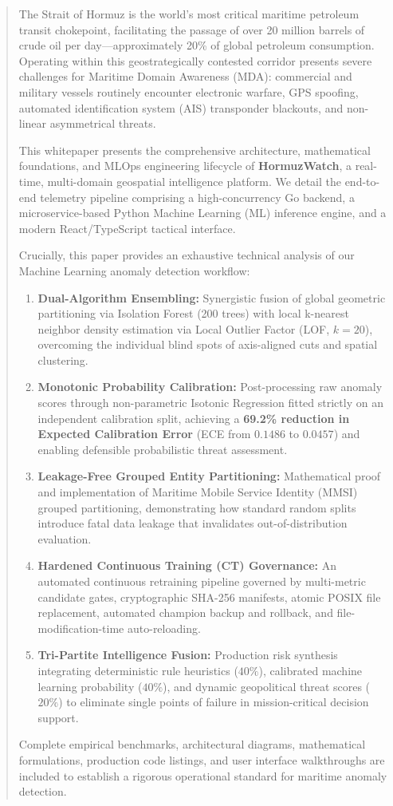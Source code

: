 \begin{abstract}
The Strait of Hormuz is the world's most critical maritime petroleum transit chokepoint, facilitating the passage of over 20 million barrels of crude oil per day—approximately 20\% of global petroleum consumption. Operating within this geostrategically contested corridor presents severe challenges for Maritime Domain Awareness (MDA): commercial and military vessels routinely encounter electronic warfare, GPS spoofing, automated identification system (AIS) transponder blackouts, and non-linear asymmetrical threats. 

This whitepaper presents the comprehensive architecture, mathematical foundations, and MLOps engineering lifecycle of \textbf{HormuzWatch}, a real-time, multi-domain geospatial intelligence platform. We detail the end-to-end telemetry pipeline comprising a high-concurrency Go backend, a microservice-based Python Machine Learning (ML) inference engine, and a modern React/TypeScript tactical interface. 

Crucially, this paper provides an exhaustive technical analysis of our Machine Learning anomaly detection workflow:
\begin{enumerate}[leftmargin=*]
    \item \textbf{Dual-Algorithm Ensembling:} Synergistic fusion of global geometric partitioning via Isolation Forest (200 trees) with local k-nearest neighbor density estimation via Local Outlier Factor (LOF, $k=20$), overcoming the individual blind spots of axis-aligned cuts and spatial clustering.
    \item \textbf{Monotonic Probability Calibration:} Post-processing raw anomaly scores through non-parametric Isotonic Regression fitted strictly on an independent calibration split, achieving a \textbf{69.2\% reduction in Expected Calibration Error} (ECE from $0.1486$ to $0.0457$) and enabling defensible probabilistic threat assessment.
    \item \textbf{Leakage-Free Grouped Entity Partitioning:} Mathematical proof and implementation of Maritime Mobile Service Identity (MMSI) grouped partitioning, demonstrating how standard random splits introduce fatal data leakage that invalidates out-of-distribution evaluation.
    \item \textbf{Hardened Continuous Training (CT) Governance:} An automated continuous retraining pipeline governed by multi-metric candidate gates, cryptographic SHA-256 manifests, atomic POSIX file replacement, automated champion backup and rollback, and file-modification-time auto-reloading.
    \item \textbf{Tri-Partite Intelligence Fusion:} Production risk synthesis integrating deterministic rule heuristics ($40\%$), calibrated machine learning probability ($40\%$), and dynamic geopolitical threat scores ($20\%$) to eliminate single points of failure in mission-critical decision support.
\end{enumerate}

Complete empirical benchmarks, architectural diagrams, mathematical formulations, production code listings, and user interface walkthroughs are included to establish a rigorous operational standard for maritime anomaly detection.
\end{abstract}
